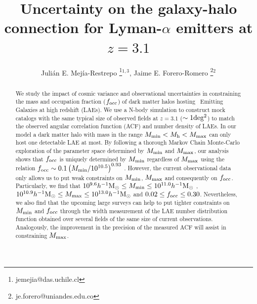 \documentclass{emulateapj}
\newcommand{\ly}{{\ifmmode{{\rm Ly}\alpha}\else{Ly$\alpha$}\fi}}
\newcommand{\hMsun}{{\ifmmode{h^{-1}{\rm {M_{\odot}}}}\else{$h^{-1}{\rm{M_{\odot}}}$}\fi}}
\newcommand{\mmin}{{\ifmmode{{M_{\rm min}}}\else{${M_{\rm min}}$}\fi}}
\newcommand{\focc}{{\ifmmode{{f_{\rm occ}}}\else{${f_{\rm occ}}$}\fi}}
\begin{document}
\title{Uncertainty on the galaxy-halo connection for Lyman-$\alpha$ emitters at $z=3.1$}
\author{
  Juli\'an E. Mej\'ia-Restrepo \thanks{jemejia@das.uchile.cl}$^{1,3}$,
  Jaime E. Forero-Romero \thanks{je.forero@uniandes.edu.co}$^{2}$ 
}






\begin{abstract}
We study the impact of cosmic variance and observational uncertainties in constraining the mass and  occupation fraction ($f_{\rm occ}$) of dark matter halos hosting \ly\ Emitting  Galaxies at high redshift (LAEs).
We use a N-body simulation to construct mock catalogs with the same typical size  of observed fields at $z=3.1$ ($\sim 1 {\rm deg^2}$) to match the observed  angular correlation function (ACF) and number density of LAEs.  
In our model a dark matter halo with mass in the range $M_{\rm min}<M_{\mathrm h}<M_{\rm   max}$ can only host one detectable LAE at most. By following a thorough Markov Chain Monte-Carlo exploration of the parameter space determined by $M_{\rm min}$ and $M_{\rm   max}$, our analysis shows that $f_{\rm occ}$ is uniquely determined by $M_{\rm min}$ regardless of $M_{\rm max}$ using the relation $\focc\sim0.1\left(\mmin/10^{10.5}\right)^{0.93}$ . 
However, the current observational data only allows us to put weak constraints on $M_{\rm min}$, $M_{\rm max}$ and consequently on $f_{\rm occ}$. 
Particularly, we find that $10^{9.6}\hMsun\leq M_{\rm min}\leq 10^{11.0}\hMsun$ , $10^{10.9}\hMsun\leq M_{\rm max}\leq 10^{13.0}\hMsun$ and $0.02\leq f_{\rm occ}\leq 0.30$. 
Nevertheless, we also find that  the upcoming large surveys can help to put tighter constraints on $M_{\rm min}$ and $f_{\rm occ}$ through the width measurement of the LAE number distribution function obtained over several fields of the same size of current observations. 
Analogously, the  improvement in the precision of the measured ACF will assist in constraining $M_{\rm max}$.  
\end{abstract}
\end{document}
